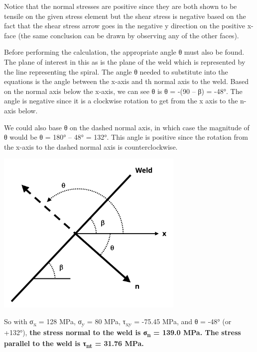 \documentclass[
  letterpaper,
  DIV=11,
  numbers=noendperiod]{scrreprt}
\theoremstyle{definition}
\theoremstyle{remark}
\begin{document}
\begin{tcolorbox}
\begin{tcolorbox}
Notice that the normal stresses are positive since they are both shown
to be tensile on the given stress element but the shear stress is
negative based on the fact that the shear stress arrow goes in the
negative y direction on the positive x-face (the same conclusion can be
drawn by observing any of the other faces).

Before performing the calculation, the appropriate angle θ must also be
found. The plane of interest in this as is the plane of the weld which
is represented by the line representing the spiral. The angle θ needed
to substitute into the equations is the angle between the x-axis and th
normal axis to the weld. Based on the normal axis below the x-axis, we
can see θ is θ = -(90 -- β) = -48°. The angle is negative since it is a
clockwise rotation to get from the x axis to the n-axis below.

We could also base θ on the dashed normal axis, in which case the
magnitude of θ would be θ = 180° -- 48° = 132°. This angle is positive
since the rotation from the x-axis to the dashed normal axis is
counterclockwise.

\begin{center}
\includegraphics[width=3.54167in,height=\textheight]{images/CH12 figures/example 12.1 part 2.png}
\end{center}

So with σ\textsubscript{x} = 128 MPa, σ\textsubscript{y} = 80 MPa,
τ\textsubscript{xy} = -75.45 MPa, and θ = -48° (or +132°), \textbf{the
stress normal to the weld is σ\textsubscript{n} = 139.0 MPa. The stress
parallel to the weld is τ\textsubscript{nt} = 31.76 MPa.}

\end{tcolorbox}

\end{tcolorbox}
\end{document}
